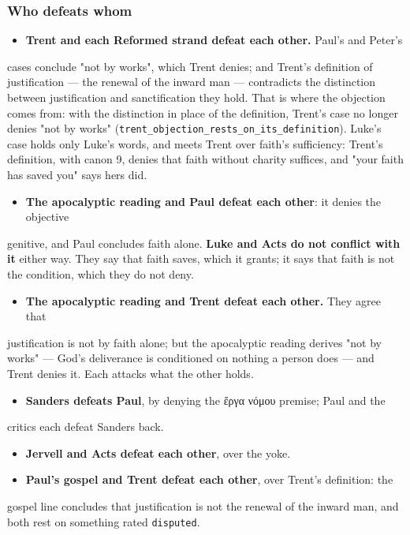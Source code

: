 \documentclass[11pt]{article}
\begin{document}
\subsubsection*{Who defeats whom}
\begin{itemize}
  \item \textbf{Trent and each Reformed strand defeat each other.} Paul's and Peter's
\end{itemize}
  cases conclude "not by works", which Trent denies; and Trent's definition of   justification — the renewal of the inward man — contradicts the distinction   between justification and sanctification they hold. That is where the   objection comes from: with the distinction in place of the definition, Trent's   case no longer denies "not by works"   (\texttt{trent\_\allowbreak{}objection\_\allowbreak{}rests\_\allowbreak{}on\_\allowbreak{}its\_\allowbreak{}definition}). Luke's case holds only Luke's   words, and meets Trent over faith's sufficiency: Trent's definition, with   canon 9, denies that faith without charity suffices, and "your faith has   saved you" says hers did.

\begin{itemize}
  \item \textbf{The apocalyptic reading and Paul defeat each other}: it denies the objective
\end{itemize}
  genitive, and Paul concludes faith alone. \textbf{Luke and Acts do not conflict with   it} either way. They say that faith saves, which it grants; it says that   faith is not the condition, which they do not deny.

\begin{itemize}
  \item \textbf{The apocalyptic reading and Trent defeat each other.} They agree that
\end{itemize}
  justification is not by faith alone; but the apocalyptic reading derives "not   by works" — God's deliverance is conditioned on nothing a person does — and   Trent denies it. Each attacks what the other holds.

\begin{itemize}
  \item \textbf{Sanders defeats Paul}, by denying the ἔργα νόμου premise; Paul and the
\end{itemize}
  critics each defeat Sanders back.

\begin{itemize}
  \item \textbf{Jervell and Acts defeat each other}, over the yoke.
  \item \textbf{Paul's gospel and Trent defeat each other}, over Trent's definition: the
\end{itemize}
  gospel line concludes that justification is not the renewal of the inward   man, and both rest on something rated \texttt{disputed}.
\end{document}
